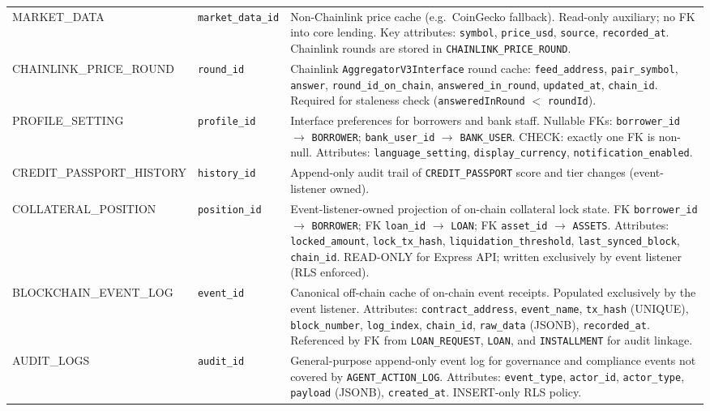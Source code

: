 \documentclass[12pt,a4paper]{report}
\begin{document}
\begin{table}[H]
\begin{tabular}{@{}p{2.6cm}p{3.4cm}p{7.0cm}@{}}
MARKET\_DATA & \texttt{market\_data\_id} & Non-Chainlink price cache (e.g.\ CoinGecko fallback). Read-only auxiliary; no FK into core lending. Key attributes: \texttt{symbol}, \texttt{price\_usd}, \texttt{source}, \texttt{recorded\_at}. Chainlink rounds are stored in \texttt{CHAINLINK\_PRICE\_ROUND}. \\
CHAINLINK\_PRICE\_ROUND & \texttt{round\_id} & Chainlink \texttt{AggregatorV3Interface} round cache: \texttt{feed\_address}, \texttt{pair\_symbol}, \texttt{answer}, \texttt{round\_id\_on\_chain}, \texttt{answered\_in\_round}, \texttt{updated\_at}, \texttt{chain\_id}. Required for staleness check (\texttt{answeredInRound} $<$ \texttt{roundId}). \\
PROFILE\_SETTING & \texttt{profile\_id} & Interface preferences for borrowers and bank staff. Nullable FKs: \texttt{borrower\_id} $\to$ \texttt{BORROWER}; \texttt{bank\_user\_id} $\to$ \texttt{BANK\_USER}. CHECK: exactly one FK is non-null. Attributes: \texttt{language\_setting}, \texttt{display\_currency}, \texttt{notification\_enabled}. \\
CREDIT\_PASSPORT\_HISTORY & \texttt{history\_id} & Append-only audit trail of \texttt{CREDIT\_PASSPORT} score and tier changes (event-listener owned). \\
COLLATERAL\_POSITION & \texttt{position\_id} & Event-listener-owned projection of on-chain collateral lock state. FK \texttt{borrower\_id} $\to$ \texttt{BORROWER}; FK \texttt{loan\_id} $\to$ \texttt{LOAN}; FK \texttt{asset\_id} $\to$ \texttt{ASSETS}. Attributes: \texttt{locked\_amount}, \texttt{lock\_tx\_hash}, \texttt{liquidation\_threshold}, \texttt{last\_synced\_block}, \texttt{chain\_id}. READ-ONLY for Express API; written exclusively by event listener (RLS enforced). \\
BLOCKCHAIN\_EVENT\_LOG & \texttt{event\_id} & Canonical off-chain cache of on-chain event receipts. Populated exclusively by the event listener. Attributes: \texttt{contract\_address}, \texttt{event\_name}, \texttt{tx\_hash} (UNIQUE), \texttt{block\_number}, \texttt{log\_index}, \texttt{chain\_id}, \texttt{raw\_data} (JSONB), \texttt{recorded\_at}. Referenced by FK from \texttt{LOAN\_REQUEST}, \texttt{LOAN}, and \texttt{INSTALLMENT} for audit linkage. \\
AUDIT\_LOGS & \texttt{audit\_id} & General-purpose append-only event log for governance and compliance events not covered by \texttt{AGENT\_ACTION\_LOG}. Attributes: \texttt{event\_type}, \texttt{actor\_id}, \texttt{actor\_type}, \texttt{payload} (JSONB), \texttt{created\_at}. INSERT-only RLS policy. \\
\bottomrule
\end{tabular}
\end{table}
\end{document}
